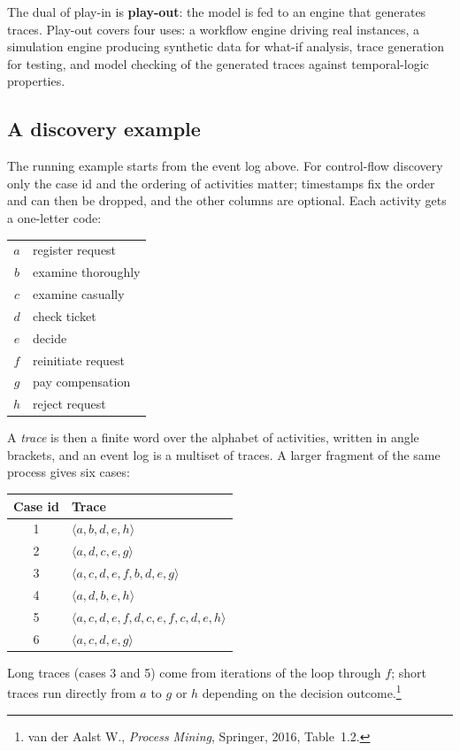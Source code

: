 The dual of play-in is \textbf{play-out}: the model is fed to an engine that generates traces. Play-out covers four uses: a workflow engine driving real instances, a simulation engine producing synthetic data for what-if analysis, trace generation for testing, and model checking of the generated traces against temporal-logic properties.

\subsection{A discovery example}

The running example starts from the event log above. For control-flow discovery only the case id and the ordering of activities matter; timestamps fix the order and can then be dropped, and the other columns are optional. Each activity gets a one-letter code:
\begin{center}
\begin{tabular}{cl}
\toprule
$a$ & register request \\
$b$ & examine thoroughly \\
$c$ & examine casually \\
$d$ & check ticket \\
$e$ & decide \\
$f$ & reinitiate request \\
$g$ & pay compensation \\
$h$ & reject request \\
\bottomrule
\end{tabular}
\end{center}
A \emph{trace} is then a finite word over the alphabet of activities, written in angle brackets, and an event log is a multiset of traces. A larger fragment of the same process gives six cases:
\begin{center}
\begin{tabular}{cl}
\toprule
\textbf{Case id} & \textbf{Trace} \\
\midrule
1 & $\langle a, b, d, e, h\rangle$ \\
2 & $\langle a, d, c, e, g\rangle$ \\
3 & $\langle a, c, d, e, f, b, d, e, g\rangle$ \\
4 & $\langle a, d, b, e, h\rangle$ \\
5 & $\langle a, c, d, e, f, d, c, e, f, c, d, e, h\rangle$ \\
6 & $\langle a, c, d, e, g\rangle$ \\
\bottomrule
\end{tabular}
\end{center}
Long traces (cases 3 and 5) come from iterations of the loop through $f$; short traces run directly from $a$ to $g$ or $h$ depending on the decision outcome.\footnote{van der Aalst W., \emph{Process Mining}, Springer, 2016, Table~1.2.}

